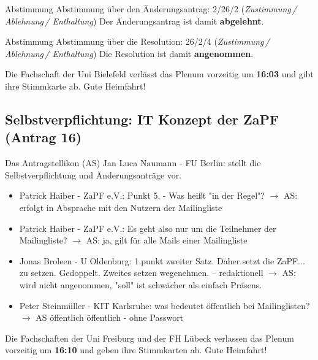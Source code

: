     \begin{danger}{Abstimmung}
      Abstimmung über den Änderungsantrag: 2/26/2 (\textit{Zustimmung\,/ Ablehnung\,/ Enthaltung})
      Der Änderungsantrag ist damit \textbf{abgelehnt}.
    \end{danger}

    \begin{success}{Abstimmung}
      Abstimmung über die Resolution: 26/2/4 (\textit{Zustimmung\,/ Ablehnung\,/ Enthaltung})
      Die Resolution ist damit \textbf{angenommen}.
    \end{success}

    \begin{info}{}
      Die Fachschaft der Uni Bielefeld verlässt das Plenum vorzeitig um \textbf{16:03} und gibt ihre Stimmkarte ab. Gute Heimfahrt!
    \end{info}

  \subsection*{Selbstverpflichtung: IT Konzept der ZaPF (Antrag 16)}
    Das Antragstellikon (AS) Jan Luca Naumann - FU Berlin:  stellt die Selbstverpflichtung und Änderungsanträge vor.
    \begin{itemize}
      \item Patrick Haiber - ZaPF e.V.:  Punkt 5. - Was heißt "in der Regel"?
        $\rightarrow$ AS: erfolgt in Absprache mit den Nutzern der Mailingliste
      \item Patrick Haiber - ZaPF e.V.:  Es geht also nur um die Teilnehmer der Mailingliste?
        $\rightarrow$ AS: ja, gilt für alle Mails einer Mailingliste
      \item Jonas Broleen - U Oldenburg:  1.punkt zweiter Satz. Daher setzt die ZaPF... zu setzen. Gedoppelt. Zweites setzen  wegenehmen. -- redaktionell
        $\rightarrow$ AS: wird nicht angenommen, "soll" ist schwächer als einfach Präsens.
      \item Peter Steinmüller - KIT Karlsruhe:  was bedeutet öffentlich bei Mailinglisten?
        $\rightarrow$ AS öffentlich öffentlich - ohne Passwort
    \end{itemize}

    \begin{info}{}
      Die Fachschaften der Uni Freiburg und der FH Lübeck verlassen das Plenum vorzeitig um \textbf{16:10} und geben ihre Stimmkarten ab. Gute Heimfahrt!
    \end{info}

